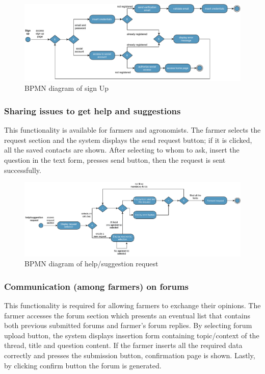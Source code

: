 \begin{figure}[H]
	\centering
    \includegraphics[width=\textwidth]{Images/BPMN/signup.pdf}
	\caption{\label{fig:bpmn_sign_up}BPMN diagram of sign Up}
\end{figure}

\subsubsection{Sharing issues to get help and suggestions}
This functionality is available for farmers and agronomists. The farmer selects the request section and the system displays the send request button; if it is clicked, all the saved contacts are shown. After selecting to whom to ask, insert the question in the text form, presses send button, then the request is sent successfully.


\begin{figure}[H]
	\centering
    \includegraphics[width=\textwidth]{Images/BPMN/help-suggestion-request.pdf}
	\caption{\label{fig:bpmn_request}BPMN diagram of help/suggestion request}
\end{figure}


\subsubsection{Communication (among farmers) on forums}
This functionality is required for allowing farmers to exchange their opinions. The farmer accesses the forum section which presents an eventual list that contains both previous submitted forums and farmer’s forum replies. By selecting forum upload button, the system displays 
insertion form containing topic/context of the thread, title and question content. If the farmer 
inserts all the required data correctly and presses the submission button, confirmation page is shown. Lastly, by clicking confirm button the forum is generated. 

